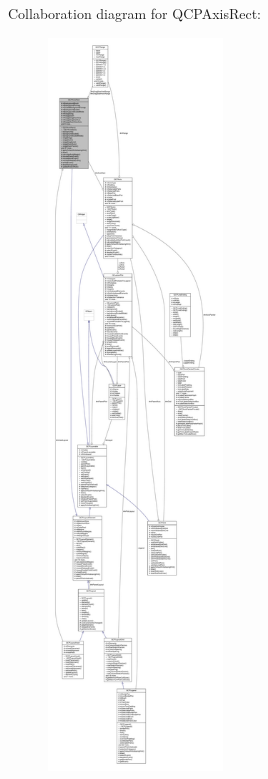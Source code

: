 Collaboration diagram for Q\+C\+P\+Axis\+Rect\+:\nopagebreak
\begin{figure}[H]
\begin{center}
\leavevmode
\includegraphics[height=550pt]{class_q_c_p_axis_rect__coll__graph}
\end{center}
\end{figure}
